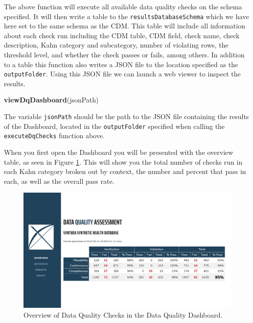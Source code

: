 \documentclass[11pt]{book}
\newenvironment{Shaded}{\begin{snugshade}}{\end{snugshade}}
\newcommand{\KeywordTok}[1]{\textcolor[rgb]{0.13,0.29,0.53}{\textbf{#1}}}
\newcommand{\NormalTok}[1]{#1}
\theoremstyle{definition}
\theoremstyle{definition}
\theoremstyle{definition}
\theoremstyle{remark}
\begin{document}
The above function will execute all available data quality checks on the
schema specified. It will then write a table to the
\texttt{resultsDatabaseSchema} which we have here set to the same schema
as the CDM. This table will include all information about each check run
including the CDM table, CDM field, check name, check description, Kahn
category and subcategory, number of violating rows, the threshold level,
and whether the check passes or fails, among others. In addition to a
table this function also writes a JSON file to the location specified as
the \texttt{outputFolder}. Using this JSON file we can launch a web
viewer to inspect the results.

\begin{Shaded}
\begin{Highlighting}[]
\KeywordTok{viewDqDashboard}\NormalTok{(jsonPath)}
\end{Highlighting}
\end{Shaded}

The variable \texttt{jsonPath} should be the path to the JSON file
containing the results of the Dashboard, located in the
\texttt{outputFolder} specified when calling the
\texttt{executeDqChecks} function above.

When you first open the Dashboard you will be presented with the
overview table, as seen in Figure \ref{fig:dqdOverview}. This will show
you the total number of checks run in each Kahn category broken out by
context, the number and percent that pass in each, as well as the
overall pass rate.

\begin{figure}

{\centering \includegraphics[width=1\linewidth]{images/DataQuality/dqdOverview} 

}

\caption{Overview of Data Quality Checks in the Data Quality Dashboard.}\label{fig:dqdOverview}
\end{figure}
\end{document}
